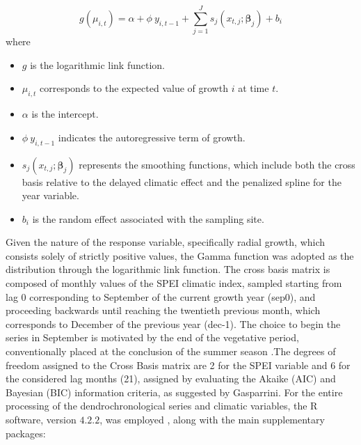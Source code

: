 \documentclass[12pt, a4paper]{article}
\begin{document}
\begin{equation}g(\mu_{i,t}) = \alpha + \phi\ y_{i,t-1} + \sum_{j=1}^{J} s_j(x_{t,j}; \boldsymbol{\beta}_j) + b_i
\end{equation}
where
\begin{itemize}
    \item $g$ is the logarithmic link function.
    \item $\mu_{i,t}$ corresponds to the expected value of growth $i$ at time $t$.
    \item $\alpha$ is the intercept.
    \item $\phi\ y_{i,t-1}$ indicates the autoregressive term of growth.
    \item $s_j(x_{t,j}; \boldsymbol{\beta}_j)$ represents the smoothing functions, which include both the cross basis relative to the delayed climatic effect and the penalized spline for the year variable.
    \item $b_i$ is the random effect associated with the sampling site.
\end{itemize}Given the nature of the response variable, specifically radial growth, which consists solely of strictly positive values, the Gamma function was adopted as the distribution through the logarithmic link function. The cross basis matrix is composed of monthly values of the SPEI climatic index, sampled starting from lag 0 corresponding to September of the current growth year (sep0), and proceeding backwards until reaching the twentieth previous month, which corresponds to December of the previous year (dec-1). The choice to begin the series in September is motivated by the end of the vegetative period, conventionally placed at the conclusion of the summer season \parencite{menzel2006}.The degrees of freedom assigned to the Cross Basis matrix are 2 for the SPEI variable and 6 for the considered lag months (21), assigned by evaluating the Akaike (AIC) and Bayesian (BIC) information criteria, as suggested by Gasparrini. For the entire processing of the dendrochronological series and climatic variables, the R software, version $4.2.2$, was employed \parencite{team-r2022}, along with the main supplementary packages:
\end{document}
